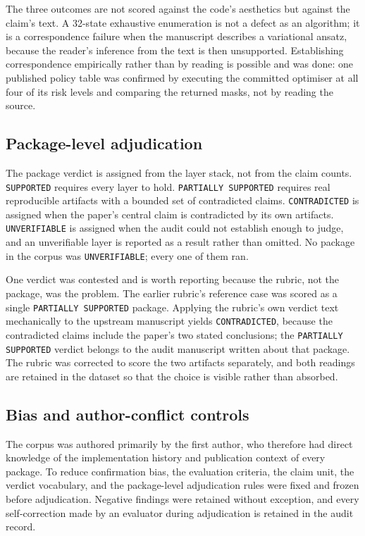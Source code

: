 \documentclass[sigconf,review]{acmart}
\begin{document}
The three outcomes are not scored against the code's aesthetics but against
the claim's text. A 32-state exhaustive enumeration is not a defect as an
algorithm; it is a correspondence failure when the manuscript describes a
variational ansatz, because the reader's inference from the text is then
unsupported. Establishing correspondence empirically rather than by reading is
possible and was done: one published policy table was confirmed by executing
the committed optimiser at all four of its risk levels and comparing the
returned masks, not by reading the source.

\subsection{Package-level adjudication}
\label{sec:method-package}

The package verdict is assigned from the layer stack, not from the claim
counts. \texttt{SUPPORTED} requires every layer to hold.
\texttt{PARTIALLY SUPPORTED} requires real reproducible artifacts with a
bounded set of contradicted claims. \texttt{CONTRADICTED} is assigned when the
paper's central claim is contradicted by its own artifacts.
\texttt{UNVERIFIABLE} is assigned when the audit could not establish enough to
judge, and an unverifiable layer is reported as a result rather than omitted.
No package in the corpus was \texttt{UNVERIFIABLE}; every one of them ran.

One verdict was contested and is worth reporting because the rubric, not the
package, was the problem. The earlier rubric's reference case was scored as a
single \texttt{PARTIALLY SUPPORTED} package. Applying the rubric's own verdict
text mechanically to the upstream manuscript yields \texttt{CONTRADICTED},
because the contradicted claims include the paper's two stated conclusions;
the \texttt{PARTIALLY SUPPORTED} verdict belongs to the audit manuscript
written about that package. The rubric was corrected to score the two
artifacts separately, and both readings are retained in the dataset so that
the choice is visible rather than absorbed.

\subsection{Bias and author-conflict controls}
\label{sec:method-bias}

The corpus was authored primarily by the first author, who therefore had
direct knowledge of the implementation history and publication context of
every package. To reduce confirmation bias, the evaluation criteria, the claim
unit, the verdict vocabulary, and the package-level adjudication rules were
fixed and frozen before adjudication. Negative findings were retained without
exception, and every self-correction made by an evaluator during adjudication
is retained in the audit record.
\end{document}
